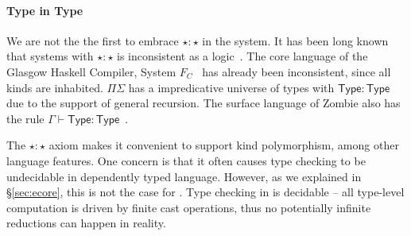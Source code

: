 

\paragraph{Type in Type}
We are not the the first to embrace $\star : \star$ in the system. It
has been long known that systems with $\star : \star$ is inconsistent
as a logic~\cite{handbook}. The core language of the Glasgow Haskell
Compiler, System $F_{C}$~\cite{fc} has already been inconsistent,
since all kinds are inhabited. $\Pi\Sigma$ has a impredicative
universe of types with $\mathsf{Type} : \mathsf{Type}$ due to the
support of general recursion. The surface language of Zombie also has
the rule
$\Gamma \vdash \mathsf{Type} : \mathsf{Type}$~\cite{zombie:popl15}.

The $\star : \star$ axiom makes it convenient to support kind
polymorphism, among other language features. One concern is that it
often causes type checking to be undecidable in dependently typed
language.  However, as we explained in \S\ref{sec:ecore}, this is not
the case for \name. Type checking in \name is decidable -- all
type-level computation is driven by finite cast operations, thus no
potentially infinite reductions can happen in reality.

